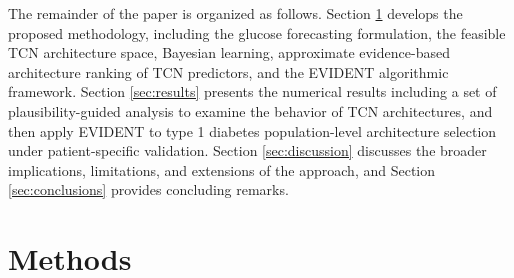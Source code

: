 \documentclass[preprint,12pt]{elsarticle}
\begin{document}
The remainder of the paper is organized as follows. 
Section \ref{sec:methods} develops the proposed methodology, including the glucose forecasting formulation, the feasible TCN architecture space, Bayesian learning, approximate evidence-based architecture ranking of TCN predictors, and the EVIDENT algorithmic framework. 
Section \ref{sec:results} presents the numerical results including a set of plausibility-guided analysis to examine the behavior of TCN architectures, and then apply EVIDENT to type 1 diabetes population-level architecture selection under patient-specific validation. 
Section \ref{sec:discussion} discusses the broader implications, limitations, and extensions of the approach, and Section \ref{sec:conclusions} provides concluding remarks.


\section{Methods}\label{sec:methods}

\end{document}
